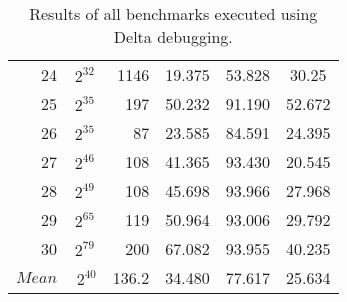 \begin{table}[b!]
\begin{tabular}{rSrSSS}
    24 & {$2^{32}$} & 1146 & 19.375 & 53.828 & 30.25  \\
    25 & {$2^{35}$} & 197 & 50.232 & 91.190 & 52.672 \\
    26 & {$2^{35}$} & 87 & 23.585 & 84.591 & 24.395 \\
    27 & {$2^{46}$} & 108 & 41.365 & 93.430 & 20.545 \\
    28 & {$2^{49}$} & 108 & 45.698 & 93.966 & 27.968 \\
    29 & {$2^{65}$} & 119 & 50.964 & 93.006 & 29.792 \\
    30 & {$2^{79}$} & 200 & 67.082 & 93.955 & 40.235 \\	\midrule
	{$Mean$} & {$~2^{40}$} & 136.2 & 34.480 & 77.617 & 25.634 \\	\bottomrule
\end{tabular}
\caption{Results of all benchmarks executed using Delta debugging.}
\label{tab:resultsdelta}
\end{table}

